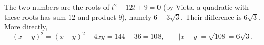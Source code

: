 The two numbers are the roots of $t^2-12t+9=0$ (by Vieta, a quadratic with these roots has sum $12$ and product $9$), namely $6\pm3\sqrt3$. Their difference is $6\sqrt3$. More directly,
\[(x-y)^2=(x+y)^2-4xy=144-36=108,\qquad |x-y|=\sqrt{108}=\boxed{6\sqrt3}.\]
